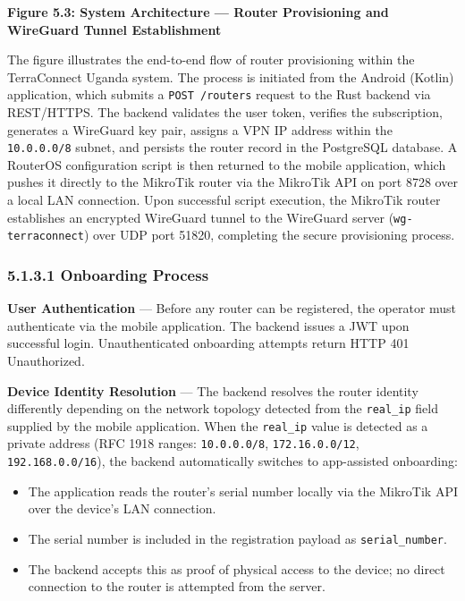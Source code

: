 \documentclass[12pt,a4paper,oneside]{report}
\begin{document}
\textbf{Figure 5.3: System Architecture --- Router Provisioning and WireGuard Tunnel Establishment}

The figure illustrates the end-to-end flow of router provisioning within the TerraConnect Uganda system. The process is initiated from the Android (Kotlin) application, which submits a \texttt{POST /routers} request to the Rust backend via REST/HTTPS. The backend validates the user token, verifies the subscription, generates a WireGuard key pair, assigns a VPN IP address within the \texttt{10.0.0.0/8} subnet, and persists the router record in the PostgreSQL database. A RouterOS configuration script is then returned to the mobile application, which pushes it directly to the MikroTik router via the MikroTik API on port 8728 over a local LAN connection. Upon successful script execution, the MikroTik router establishes an encrypted WireGuard tunnel to the WireGuard server (\texttt{wg-terraconnect}) over UDP port 51820, completing the secure provisioning process.

\subsubsection{5.1.3.1 Onboarding Process}

\textbf{User Authentication} --- Before any router can be registered, the operator must authenticate via the mobile application. The backend issues a JWT upon successful login. Unauthenticated onboarding attempts return HTTP 401 Unauthorized.

\textbf{Device Identity Resolution} --- The backend resolves the router identity differently depending on the network topology detected from the \texttt{real\_ip} field supplied by the mobile application. When the \texttt{real\_ip} value is detected as a private address (RFC 1918 ranges: \texttt{10.0.0.0/8}, \texttt{172.16.0.0/12}, \texttt{192.168.0.0/16}), the backend automatically switches to app-assisted onboarding:

\begin{itemize}
  \item The application reads the router's serial number locally via the MikroTik API over the device's LAN connection.
  \item The serial number is included in the registration payload as \texttt{serial\_number}.
  \item The backend accepts this as proof of physical access to the device; no direct connection to the router is attempted from the server.
\end{itemize}
\end{document}
